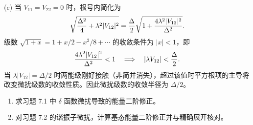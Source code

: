 \begin{solution}
(c) 当 $V_{11}=V_{22}=0$ 时，根号内简化为
\[
\sqrt{{\Delta^2\over4}+\lambda^2|V_{12}|^2}
={\Delta\over2}\sqrt{1+{4\lambda^2|V_{12}|^2\over\Delta^2}}.
\]
级数 $\sqrt{1+x}=1+x/2-x^2/8+\cdots$ 的收敛条件为 $|x|<1$，即
\[
{4\lambda^2|V_{12}|^2\over\Delta^2}<1\quad\Longrightarrow\quad
|\lambda V_{12}|<{\Delta\over2}.
\]
当 $\lambda|V_{12}|=\Delta/2$ 时两能级刚好接触（非简并消失），超过该值时平方根项的主导将改变微扰级数的收敛性质。因此微扰级数的收敛半径为 $\Delta/2$。
\end{solution}

\begin{question}
\begin{enumerate}
\item 求习题 7.1 中 $\delta$ 函数微扰导致的能量二阶修正。
\item 对习题 7.2 的谐振子微扰，计算基态能量二阶修正并与精确展开核对。
\end{enumerate}
\end{question}
